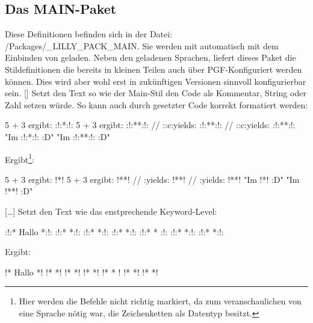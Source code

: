 \subsection{Das MAIN-Paket}
Diese Definitionen befinden sich in der Datei: {\ltt{}/Packages/\_LILLY\_PACK\_MAIN}. Sie werden mit  automatisch mit dem Einbinden von  geladen.\medskip\newline
Neben den geladenen Sprachen, liefert dieses Paket die Stildefinitionen die bereits in kleinen Teilen auch über PGF-Konfiguriert werden können. Dies wird aber wohl erst in zukünftigen Versionen sinnvoll konfigurierbar sein.\newline
%
%
%
[\cmdlist {}\cmdlist {}]
Setzt den Text so wie der Main-Stil den Code als Kommentar, String oder Zahl setzen würde. So kann auch durch  gesetzter Code korrekt formatiert werden:
\begin{latex}
\begin{java}
5 + 3 ergibt: :!:*\pgfmathresult*:!:
5 + 3 ergibt: :!:**:!:
 // ::c:yields: :!:**:!:
 // ::c:yields: :!:**:!:
"Im :!:*\LILLYxDOCUMENTxSUBNAME*:!: :D"
"Im :!:*\lststring{\LILLYxDOCUMENTxSUBNAME}*:!: :D"
\end{java}
\end{latex}
Ergibt\footnote{Hier werden die Befehle nicht richtig markiert, da zum veranschaulichen von  eine Sprache nötig war, die Zeichenketten als Datentyp besitzt.}:
\begin{java}
5 + 3 ergibt: !*\pgfmathresult*!
5 + 3 ergibt: !**!
 // :yields: !**!
 // :yields: !**!
"Im !*\LILLYxDOCUMENTxSUBNAME*! :D"
"Im !*\lststring{\LILLYxDOCUMENTxSUBNAME}*! :D"
\end{java}
%
%
%
[\cmdlist {}\cmdlist\ldots \cmdlist {}]
Setzt den Text wie das enstprechende Keyword-Level:
\begin{latex}
\begin{java}
:!:* Hallo *:!: :!:*  *:!: :!:*  *:!:
:!:*  *:!: :!:* * :!:
:!:*  *:!: :!:*  *:!:
\end{java}
\end{latex}
Ergibt:
\begin{java}
!* Hallo *! !*  *! !*  *!
!*  *! !* * !
!*  *! !*  *!
\end{java}

